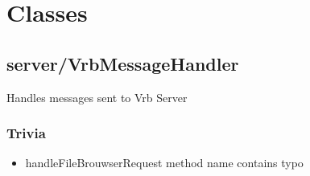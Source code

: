 
\renewcommand{\namespace}{kernel::vrb::}

\section{Classes}

\subsection{server/VrbMessageHandler}

Handles messages sent to Vrb Server

\subsubsection{Trivia}
\begin{itemize}
	\item handleFileBrouwserRequest method name contains typo
\end{itemize}